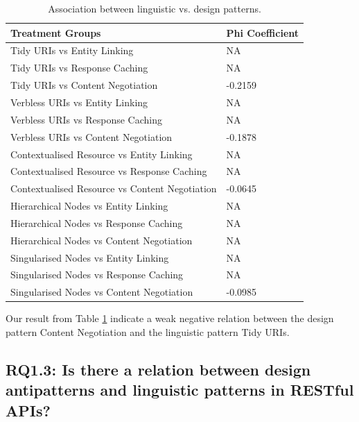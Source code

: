 \begin{table}[ht!]
    \centering
    \small
  \begin{tabular}{|l|l|}
\hline \textbf{Treatment Groups} & \textbf{Phi Coefficient} 
\\ \hline 
Tidy URIs vs Entity Linking & NA
\\ \hline
Tidy URIs vs Response Caching & NA
\\ \hline
Tidy URIs vs Content Negotiation & -0.2159
\\ \hline
Verbless URIs vs Entity Linking & NA
\\ \hline
Verbless URIs vs Response Caching & NA
\\ \hline
Verbless URIs vs Content Negotiation & -0.1878
\\ \hline
Contextualised Resource vs Entity Linking & NA
\\ \hline
Contextualised Resource vs Response Caching & NA
\\ \hline
Contextualised Resource vs Content Negotiation & -0.0645
\\ \hline
Hierarchical Nodes vs Entity Linking & NA
\\ \hline
Hierarchical Nodes vs Response Caching & NA
\\ \hline
Hierarchical Nodes vs Content Negotiation & NA
\\ \hline
Singularised Nodes vs Entity Linking & NA
\\ \hline
Singularised Nodes vs Response Caching & NA
\\ \hline
Singularised Nodes vs Content Negotiation & -0.0985
\\ \hline
  \end{tabular}
    \caption{Association between linguistic vs. design patterns.}
    \label{tab:Linguisticvsdesignpatterns}
\end{table}


Our result from Table \ref{tab:Linguisticvsdesignpatterns} indicate a weak negative relation between the design pattern Content Negotiation and the linguistic pattern Tidy URIs. 

\clearpage

\subsection{RQ1.3: Is there a relation between design antipatterns and linguistic patterns in RESTful APIs?}


